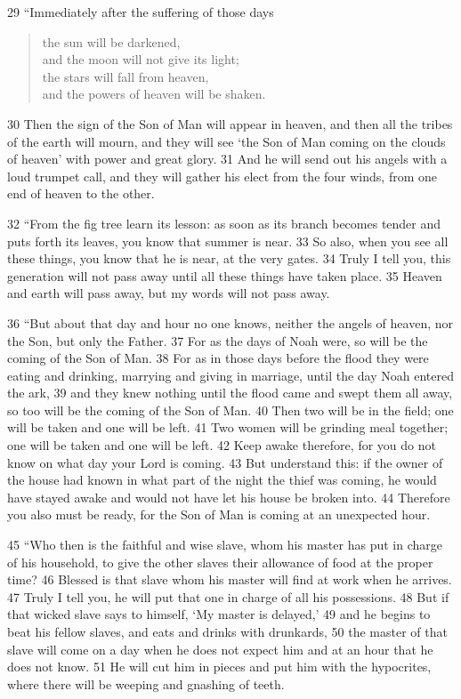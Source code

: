 29 ``Immediately after the suffering of those days
\begin{verse}
the sun will be darkened,\\
	and the moon will not give its light;\\
the stars will fall from heaven,\\
	and the powers of heaven will be shaken.\\
\end{verse}
30 Then the sign of the Son of Man will appear in heaven, and then all the 
tribes of the earth will mourn, and they will see `the Son of Man coming on the 
clouds of heaven' with power and great glory. 31 And he will send out his 
angels with a loud trumpet call, and they will gather his elect from the four 
winds, from one end of heaven to the other.

32 ``From the fig tree learn its lesson: as soon as its branch becomes tender 
and puts forth its leaves, you know that summer is near. 33 So also, when you 
see all these things, you know that he is near, at the very gates. 34 Truly I 
tell you, this generation will not pass away until all these things have taken 
place. 35 Heaven and earth will pass away, but my words will not pass away.

36 ``But about that day and hour no one knows, neither the angels of heaven, nor 
the Son, but only the Father. 37 For as the days of Noah were, so will be the 
coming of the Son of Man. 38 For as in those days before the flood they were 
eating and drinking, marrying and giving in marriage, until the day Noah 
entered the ark, 39 and they knew nothing until the flood came and swept them 
all away, so too will be the coming of the Son of Man. 40 Then two will be in 
the field; one will be taken and one will be left. 41 Two women will be 
grinding meal together; one will be taken and one will be left. 42 Keep awake 
therefore, for you do not know on what day your Lord is coming. 43 But 
understand this: if the owner of the house had known in what part of the night
the thief was coming, he would have stayed awake and would not have let his 
house be broken into. 44 Therefore you also must be ready, for the Son of Man 
is coming at an unexpected hour.

45 ``Who then is the faithful and wise slave, whom his master has put in 
charge of his household, to give the other slaves their allowance of food at 
the proper time? 46 Blessed is that slave whom his master will find at work 
when he arrives. 47 Truly I tell you, he will put that one in charge of all his 
possessions. 48 But if that wicked slave says to himself, `My master is 
delayed,' 49 and he begins to beat his fellow slaves, and eats and drinks with 
drunkards, 50 the master of that slave will come on a day when he does not 
expect him and at an hour that he does not know. 51 He will cut him in pieces 
and put him with the hypocrites, where there will be weeping and gnashing of 
teeth.
